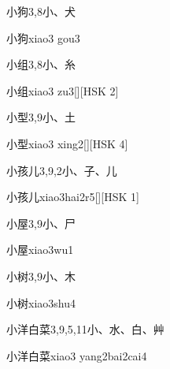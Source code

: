 \begin{Entry}{小狗}{3,8}{⼩、⽝}
  \begin{Phonetics}{小狗}{xiao3 gou3}
  \end{Phonetics}
\end{Entry}

\begin{Entry}{小组}{3,8}{⼩、⽷}
  \begin{Phonetics}{小组}{xiao3 zu3}[][HSK 2]
  \end{Phonetics}
\end{Entry}

\begin{Entry}{小型}{3,9}{⼩、⼟}
  \begin{Phonetics}{小型}{xiao3 xing2}[][HSK 4]
  \end{Phonetics}
\end{Entry}

\begin{Entry}{小孩儿}{3,9,2}{⼩、⼦、⼉}
  \begin{Phonetics}{小孩儿}{xiao3hai2r5}[][HSK 1]
  \end{Phonetics}
\end{Entry}

\begin{Entry}{小屋}{3,9}{⼩、⼫}
  \begin{Phonetics}{小屋}{xiao3wu1}
  \end{Phonetics}
\end{Entry}

\begin{Entry}{小树}{3,9}{⼩、⽊}
  \begin{Phonetics}{小树}{xiao3shu4}
  \end{Phonetics}
\end{Entry}

\begin{Entry}{小洋白菜}{3,9,5,11}{⼩、⽔、⽩、⾋}
  \begin{Phonetics}{小洋白菜}{xiao3 yang2bai2cai4}
  \end{Phonetics}
\end{Entry}

